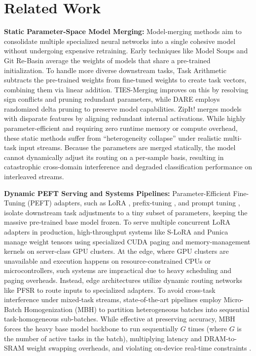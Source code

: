 \section{Related Work}
\label{sec:related_work}

\textbf{Static Parameter-Space Model Merging:} Model-merging methods aim to consolidate multiple specialized neural networks into a single cohesive model without undergoing expensive retraining. Early techniques like Model Soups \cite{wortsman2022model} and Git Re-Basin \cite{ainsworth2022git} average the weights of models that share a pre-trained initialization. To handle more diverse downstream tasks, Task Arithmetic \cite{ilharco2022editing} subtracts the pre-trained weights from fine-tuned weights to create task vectors, combining them via linear addition. TIES-Merging \cite{yadav2023ties} improves on this by resolving sign conflicts and pruning redundant parameters, while DARE \cite{yu2023dare} employs randomized delta pruning to preserve model capabilities. ZipIt! \cite{stoica2023zipit} merges models with disparate features by aligning redundant internal activations. While highly parameter-efficient and requiring zero runtime memory or compute overhead, these static methods suffer from ``heterogeneity collapse'' under realistic multi-task input streams. Because the parameters are merged statically, the model cannot dynamically adjust its routing on a per-sample basis, resulting in catastrophic cross-domain interference and degraded classification performance on interleaved streams.

\textbf{Dynamic PEFT Serving and Systems Pipelines:} Parameter-Efficient Fine-Tuning (PEFT) adapters, such as LoRA \cite{hu2021lora}, prefix-tuning \cite{li2021prefix}, and prompt tuning \cite{lester2021power}, isolate downstream task adjustments to a tiny subset of parameters, keeping the massive pre-trained base model frozen. To serve multiple concurrent LoRA adapters in production, high-throughput systems like S-LoRA \cite{sheng2023slora} and Punica \cite{chen2023punica} manage weight tensors using specialized CUDA paging and memory-management kernels on server-class GPU clusters. At the edge, where GPU clusters are unavailable and execution happens on resource-constrained CPUs or microcontrollers, such systems are impractical due to heavy scheduling and paging overheads. Instead, edge architectures utilize dynamic routing networks like PFSR \cite{pfsr2025} to route inputs to specialized adapters. To avoid cross-task interference under mixed-task streams, state-of-the-art pipelines employ Micro-Batch Homogenization (MBH) \cite{mbh2025} to partition heterogeneous batches into sequential task-homogeneous sub-batches. While effective at preserving accuracy, MBH forces the heavy base model backbone to run sequentially $G$ times (where $G$ is the number of active tasks in the batch), multiplying latency and DRAM-to-SRAM weight swapping overheads, and violating on-device real-time constraints \cite{chatterjee2024robustness}.


